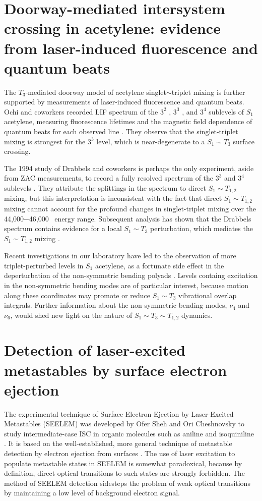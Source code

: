 \documentclass[12pt]{mitthesis}
\begin{document}
\section{Doorway-mediated intersystem crossing in acetylene: evidence
  from laser-induced fluorescence and quantum beats}

The $T_3$-mediated doorway model of acetylene singlet$\sim$triplet
mixing is further supported by measurements of laser-induced
fluorescence and quantum beats.  Ochi and coworkers recorded LIF
spectrum of the $3^2$ , $3^3$ , and $3^4$  sublevels
of $S_1$ acetylene, measuring fluorescence lifetimes and the magnetic
field dependence of quantum beats for each observed line
\cite{ochi91}.  They observe that the singlet-triplet mixing is
strongest for the $3^3$  level, which is near-degenerate to a
$S_1 \sim T_3$ surface crossing.

The 1994 study of Drabbels and coworkers is perhaps the only
experiment, aside from ZAC measurements, to record a fully resolved
spectrum of the $3^3$  and $3^4$  sublevels
\cite{drabbels94}.  They attribute the splittings in the spectrum to
direct $S_1 \sim T_{1,2}$ mixing, but this interpretation is
inconsistent with the fact that direct $S_1 \sim T_{1,2}$ mixing
cannot account for the profound changes in singlet-triplet mixing over
the 44,000$-$46,000 \rcm\ energy range.  Subsequent analysis has shown
that the Drabbels spectrum contains evidence for a local $S_1 \sim
T_3$ perturbation, which mediates the $S_1 \sim T_{1,2}$ mixing
\cite{altunata01}.

Recent investigations in our laboratory have led to the observation of
more triplet-perturbed levels in $S_1$ acetylene, as a fortunate side
effect in the deperturbation of the non-symmetric bending polyads
\cite{merer08, steeves08}.  Levels containg excitation in the
non-symmetric bending modes are of particular interest, because motion
along these coordinates may promote or reduce $S_1 \sim T_3$
vibrational overlap integrals.  Further information about the
non-symmetric bending modes, $\nu_4$ and $\nu_6$, would shed new light
on the nature of $S_1 \sim T_3 \sim T_{1,2}$ dynamics.

\section{Detection of laser-excited metastables by surface electron
  ejection}

The experimental technique of Surface Electron Ejection by
Laser-Excited Metastables (SEELEM) was developed by Ofer Sheh and Ori
Cheshnovsky to study intermediate-case ISC in organic molecules such
as aniline and isoquiniline \cite{sneh86, sneh88, sneh89a, sneh89b,
  sneh91}.  It is based on the well-established, more general
technique of metastable detection by electron ejection from surfaces
\cite{hotop96}.  The use of laser excitation to populate metastable
states in SEELEM is somewhat paradoxical, because by definition,
direct optical transitions to such states are strongly forbidden.  The
method of SEELEM detection sidesteps the problem of weak optical
transitions by maintaining a low level of background electron signal.
\end{document}
